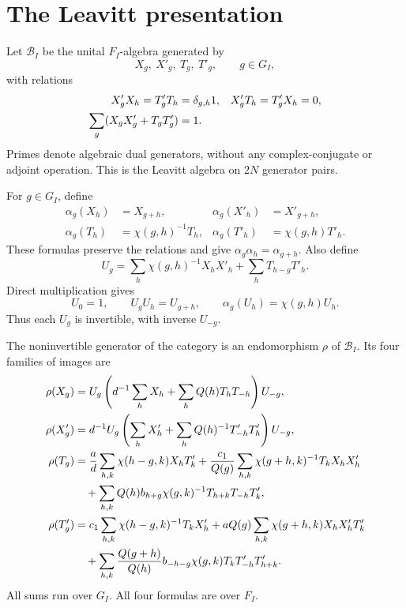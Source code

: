 \section{The Leavitt presentation}
\label{v4-arith:mf:leavitt}

Let \(\mathcal B_I\) be the unital \(F_I\)-algebra generated by
\[
 X_g,\ X'_g,\ T_g,\ T'_g,\qquad g\in G_I,
\]
with relations
\begin{align}
 X'_gX_h=T'_gT_h&=\delta_{g,h}1,&
 X'_gT_h=T'_gX_h&=0,\label{v4-arith:mf:leavitt-relations}\\
 \sum_g(X_gX'_g+T_gT'_g)&=1.&&\notag
\end{align}
Primes denote algebraic dual generators, without any
complex-conjugate or adjoint operation.
This is the Leavitt algebra on \(2N\) generator pairs.

For \(g\in G_I\), define
\begin{align*}
 \alpha_g(X_h)&=X_{g+h},&
 \alpha_g(X'_h)&=X'_{g+h},\\
 \alpha_g(T_h)&=\chi(g,h)^{-1}T_h,&
 \alpha_g(T'_h)&=\chi(g,h)T'_h.
\end{align*}
These formulas preserve the relations and give
\(\alpha_g\alpha_h=\alpha_{g+h}\).
Also define
\begin{equation}\label{v4-arith:mf:U}
 U_g=\sum_h\chi(g,h)^{-1}X_hX'_h
           +\sum_h T_{h-g}T'_h.
\end{equation}
Direct multiplication gives
\[
 U_0=1,\qquad U_gU_h=U_{g+h},\qquad
 \alpha_g(U_h)=\chi(g,h)U_h.
\]
Thus each \(U_g\) is invertible, with inverse \(U_{-g}\).

The noninvertible generator of the category is an endomorphism
\(\rho\) of \(\mathcal B_I\).
Its four families of images are
\begin{align}
 \rho(X_g)
 &=U_g\left(d^{-1}\sum_hX_h+
              \sum_h Q(h)T_hT_{-h}\right)U_{-g},
       \label{v4-arith:mf:rho-X}\\
 \rho(X'_g)
 &=d^{-1}U_g\left(\sum_hX'_h+
              \sum_h Q(h)^{-1}T'_{-h}T'_h\right)U_{-g},
       \label{v4-arith:mf:rho-Xprime}\\
 \rho(T_g)
 &=\frac ad\sum_{h,k}\chi(h-g,k)X_hT'_k
   +\frac{c_1}{Q(g)}
       \sum_{h,k}\chi(g+h,k)^{-1}T_kX_hX'_h
       \notag\\
 &\quad+\sum_{h,k}Q(h)b_{h+g}\chi(g,k)^{-1}
                       T_{h+k}T_{-h}T'_k,
       \label{v4-arith:mf:rho-T}\\
 \rho(T'_g)
 &=c_1\sum_{h,k}\chi(h-g,k)^{-1}T_kX'_h
   +aQ(g)\sum_{h,k}\chi(g+h,k)X_hX'_hT'_k
       \notag\\
 &\quad+\sum_{h,k}\frac{Q(g+h)}{Q(h)}
          b_{-h-g}\chi(g,k)T_kT'_{-h}T'_{h+k}.
       \label{v4-arith:mf:rho-Tprime}
\end{align}
All sums run over \(G_I\).
All four formulas are over \(F_I\).


